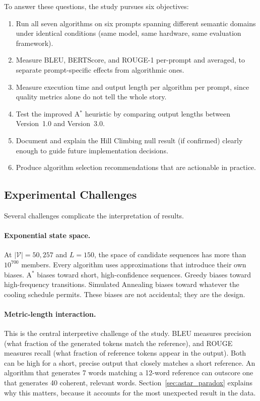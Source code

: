 \documentclass[12pt]{article}
\begin{document}
	To answer these questions, the study pursues six objectives:
	
	\begin{enumerate}[leftmargin=*]
		\item Run all seven algorithms on six prompts spanning different semantic domains under identical conditions (same model, same hardware, same evaluation framework).
		\item Measure BLEU, BERTScore, and ROUGE-1 per-prompt and averaged, to separate prompt-specific effects from algorithmic ones.
		\item Measure execution time and output length per algorithm per prompt, since quality metrics alone do not tell the whole story.
		\item Test the improved A$^*$ heuristic by comparing output lengths between Version~1.0 and Version~3.0.
		\item Document and explain the Hill Climbing null result (if confirmed) clearly enough to guide future implementation decisions.
		\item Produce algorithm selection recommendations that are actionable in practice.
	\end{enumerate}
	
	\subsection{Experimental Challenges}
	
	Several challenges complicate the interpretation of results.
	
	\paragraph{Exponential state space.}
	At $|\mathcal{V}| = 50{,}257$ and $L = 150$, the space of candidate sequences has more than $10^{700}$ members. Every algorithm uses approximations that introduce their own biases. A$^*$ biases toward short, high-confidence sequences. Greedy biases toward high-frequency transitions. Simulated Annealing biases toward whatever the cooling schedule permits. These biases are not accidental; they are the design.
	
	\paragraph{Metric-length interaction.}
	This is the central interpretive challenge of the study. BLEU measures precision (what fraction of the generated tokens match the reference), and ROUGE measures recall (what fraction of reference tokens appear in the output). Both can be high for a short, precise output that closely matches a short reference. An algorithm that generates 7 words matching a 12-word reference can outscore one that generates 40 coherent, relevant words. Section~\ref{sec:astar_paradox} explains why this matters, because it accounts for the most unexpected result in the data.
	
\end{document}
